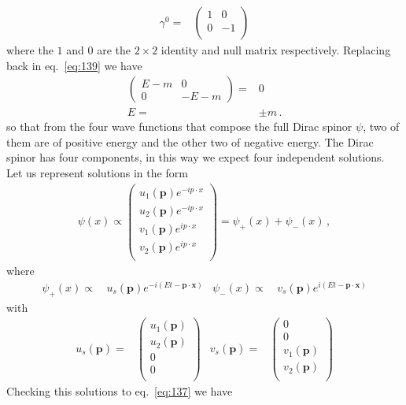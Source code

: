 \begin{align}
  \gamma^0=&\begin{pmatrix}
    1 & 0 \\
    0 & -1\\
  \end{pmatrix}
\end{align}
where the $1$ and $0$ are the $2\times2$ identity and null matrix respectively. Replacing back in eq.~\eqref{eq:139} we have
\begin{align}
  \begin{pmatrix}
    E-m&0\\
    0  &-E-m
  \end{pmatrix}=&0\nonumber\\
  E=&\pm m\,.
\end{align}
so that from the four wave functions that compose the full Dirac spinor $\psi$, two of them are of positive energy and the other two of negative energy. 
The Dirac spinor has four components, in this way we expect four independent solutions. Let us represent solutions in the form
\begin{align}
\label{eq:136}
  \psi(x)\propto
  \begin{pmatrix}
    u_1(\mathbf{p})e^{-i p\cdot x}\\
    u_2(\mathbf{p})e^{-i p\cdot x}\\
    v_1(\mathbf{p})e^{i p\cdot x}\\
    v_2(\mathbf{p})e^{i p\cdot x}\\
  \end{pmatrix}
 =\psi_+(x)+\psi_-(x)\,,
\end{align}
where
\begin{align}
  \psi_+(x)\propto\,&u_s(\mathbf{p})e^{-i (E t-\mathbf{p}\cdot \mathbf{x})}&
  \psi_-(x)\propto\,&v_s(\mathbf{p})e^{i (E t-\mathbf{p}\cdot \mathbf{x})}
\end{align}
with
\begin{align}
  u_s(\mathbf{p})=&\begin{pmatrix}
    u_1(\mathbf{p})\\
    u_2(\mathbf{p})\\
    0\\
    0\\
  \end{pmatrix}&
  v_s(\mathbf{p})=& \begin{pmatrix}
    0\\
    0\\
    v_1(\mathbf{p})\\
    v_2(\mathbf{p})\\
  \end{pmatrix}
\end{align}
Checking this solutions to eq.~\eqref{eq:137} we have

